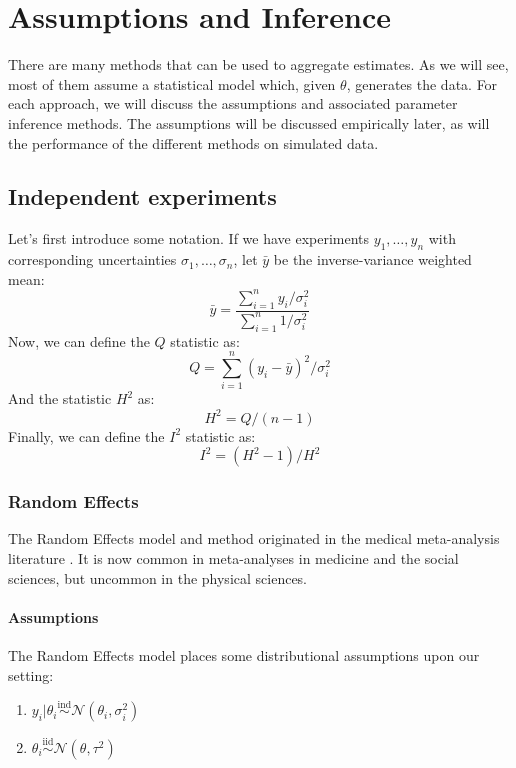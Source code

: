 \documentclass[12pt]{article}
\begin{document}
\section{Assumptions and Inference}\label{sec:methods}

There are many methods that can be used to aggregate estimates. As we will see, most of them assume a statistical model which, given $\theta$, generates the data. For each approach, we will discuss the assumptions and associated parameter inference methods. The assumptions will be discussed empirically later, as will the performance of the different methods on simulated data.

\subsection{Independent experiments}

Let's first introduce some notation. If we have experiments $y_1,\ldots,y_n$ with corresponding uncertainties $\sigma_1,\ldots,\sigma_n$, let $\bar{y}$ be the inverse-variance weighted mean:
\[\bar{y}=\frac{\sum_{i=1}^n y_i/\sigma_i^2}{\sum_{i=1}^n 1/\sigma_i^2}\]
Now, we can define the $Q$ statistic as:
\[Q=\sum_{i=1}^n (y_i-\bar{y})^2/\sigma_i^2\]
And the statistic $H^2$ as:
\[H^2=Q/(n-1)\]
Finally, we can define the $I^2$ statistic as:
\[I^2=(H^2-1)/H^2\]


\subsubsection{Random Effects}\label{random-effects}

The Random Effects model and method originated in the medical meta-analysis literature \citep{dersimonian1986meta}. It is now common in meta-analyses in medicine and the social sciences, but uncommon in the physical sciences.

\paragraph{Assumptions}\label{assumptions}

The Random Effects model places some distributional assumptions upon our setting:

\begin{enumerate}
\item
  $y_i|\theta_i\overset{\mathrm{ind}}{\sim}\mathcal{N}(\theta_i,\sigma_i^2)$
\item
  $\theta_i\overset{\mathrm{iid}}{\sim}\mathcal{N}(\theta,\tau^2)$
\end{enumerate}
\end{document}

